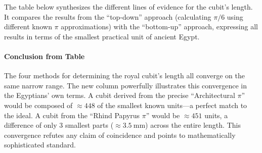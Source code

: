 \documentclass[11pt]{article}
\begin{document}
The table below synthesizes the different lines of evidence for the cubit's length. It compares the results from the ``top-down'' approach (calculating $\pi/6$ using different known $\pi$ approximations) with the ``bottom-up'' approach, expressing all results in terms of the smallest practical unit of ancient Egypt.

\begin{table}[h!]
\centering
\caption{Synthesis of Theoretical and Archaeological Evidence for the Royal Cubit's Length}
\label{tbl:cubit_synthesis}
\end{table}

\paragraph{Conclusion from Table} The four methods for determining the royal cubit's length all converge on the same narrow range. The new column powerfully illustrates this convergence in the Egyptians' own terms. A cubit derived from the precise ``Architectural $\pi$'' would be composed of $\approx448$ of the smallest known units---a perfect match to the ideal. A cubit from the ``Rhind Papyrus $\pi$'' would be $\approx451$ units, a difference of only 3 smallest parts ($\approx\SI{3.5}{\milli\meter}$) across the entire length. This convergence refutes any claim of coincidence and points to mathematically sophisticated standard.
\end{document}

